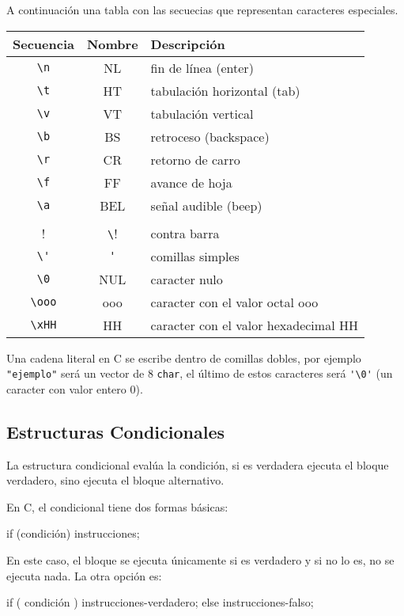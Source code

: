 A continuación una tabla con las secuecias que representan caracteres
especiales.

\begin{tabular}{ccl}
Secuencia & Nombre & Descripción \\
\hline
\lstinline!\n! &  NL & fin de línea (enter) \\
\lstinline!\t! &  HT & tabulación horizontal (tab) \\
\lstinline!\v! &  VT & tabulación vertical \\
\lstinline!\b! &  BS & retroceso (backspace) \\
\lstinline!\r! &  CR & retorno de carro \\
\lstinline!\f! &  FF & avance de hoja \\
\lstinline!\a! &  BEL & señal audible (beep) \\
\lstinline!\\! &  \verb!\! & contra barra \\
\lstinline!\'! &  \verb!'! & comillas simples \\
\lstinline!\0! &  NUL & caracter nulo \\
\lstinline!\ooo! & ooo & caracter con el valor octal ooo \\
\lstinline!\xHH! & HH  & caracter con el valor hexadecimal HH
\end{tabular}

Una cadena literal en C se escribe dentro de comillas dobles, por ejemplo
\lstinline!"ejemplo"! será un vector de 8 \lstinline!char!, el último de estos
caracteres será \lstinline!'\0'! (un caracter con valor entero 0).

\subsection{Estructuras Condicionales}

La estructura condicional evalúa la condición, si es verdadera ejecuta el
bloque verdadero, sino ejecuta el bloque alternativo.

En C, el condicional tiene dos formas básicas:

\begin{codigo-c-plano}
if (condición) {
    instrucciones;
}
\end{codigo-c-plano}

En este caso, el bloque se ejecuta únicamente si es verdadero y si no lo es,
no se ejecuta nada.  La otra opción es:

\begin{codigo-c-plano}
if ( condición ) {
    instrucciones-verdadero;
} else {
    instrucciones-falso;
}
\end{codigo-c-plano}

